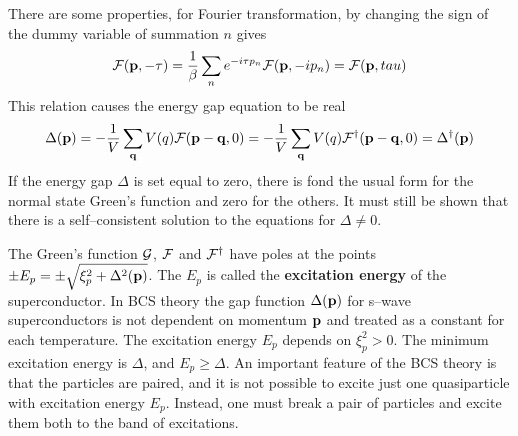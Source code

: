 There are some properties, for Fourier transformation, by changing the sign of the dummy variable of summation $n$ gives
\begin{equation}
    \mathcal{F}(\mathbf{p},-\tau) = \frac{1}{\beta} \sum_n e^{-i \tau p_n} \mathcal{F}(\mathbf{p},-ip_n) = \mathcal{F}(\mathbf{p},tau)   \label{10.59}
\end{equation}
This relation causes the energy gap equation to be real
\begin{equation}
    \Delta(\mathbf{p}) = - \frac{1}{V} \sum_{\mathbf{q}} V(q) \mathcal{F}(\mathbf{p}-\mathbf{q},0) = - \frac{1}{V} \sum_{\mathbf{q}} V(q) \mathcal{F}^\dagger(\mathbf{p}-\mathbf{q},0) = \Delta^\dagger (\mathbf{p})    \label{10.60}
\end{equation}
If the energy gap $\Delta$ is set equal to zero, there is fond the usual form for the normal state Green's function and zero for the others.
It must still be shown that there is a self--consistent solution to the equations for $\Delta \neq 0$.

The Green's function $\mathcal{G}$, $\mathcal{F}$ and $\mathcal{F}^\dagger$ have poles at the points $\pm E_p = \pm \sqrt{\xi^2_p + \Delta^2(\mathbf{p})}$.
The $E_p$ is called the \textbf{excitation energy} of the superconductor.
In BCS theory the gap function $\Delta(\mathbf{p})$ for s--wave superconductors is not dependent on momentum $\mathbf{p}$ and treated as a constant for each temperature.
The excitation energy $E_p$ depends on $\xi^2_p >0$.
The minimum excitation energy is $\Delta$, and $E_p \geq \Delta$.
An important feature of the BCS theory is that the particles are paired, and it is not possible to excite just one quasiparticle with excitation energy $E_p$.
Instead, one must break a pair of particles and excite them both to the band of excitations.

